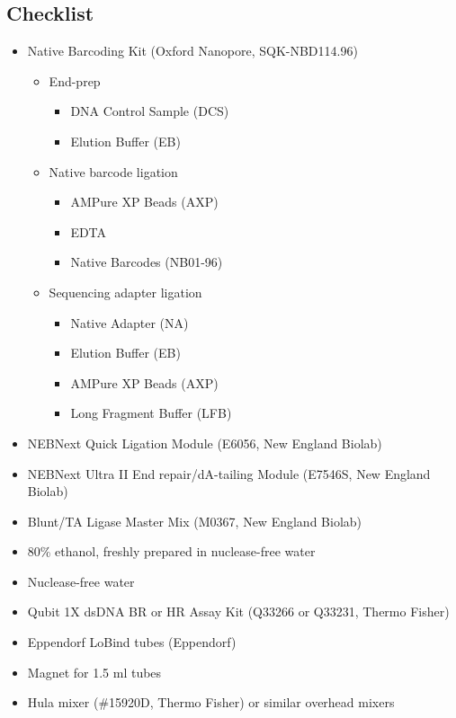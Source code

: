 \documentclass[
]{book}
\providecommand{\tightlist}{%
  \setlength{\itemsep}{0pt}\setlength{\parskip}{0pt}}
\begin{document}
\subsection{Checklist}\label{checklist-3}

\begin{itemize}
\tightlist
\item
  Native Barcoding Kit (Oxford Nanopore, SQK-NBD114.96)

  \begin{itemize}
  \tightlist
  \item
    End-prep

    \begin{itemize}
    \tightlist
    \item
      DNA Control Sample (DCS)
    \item
      Elution Buffer (EB)
    \end{itemize}
  \item
    Native barcode ligation

    \begin{itemize}
    \tightlist
    \item
      AMPure XP Beads (AXP)
    \item
      EDTA
    \item
      Native Barcodes (NB01-96)
    \end{itemize}
  \item
    Sequencing adapter ligation

    \begin{itemize}
    \tightlist
    \item
      Native Adapter (NA)
    \item
      Elution Buffer (EB)
    \item
      AMPure XP Beads (AXP)
    \item
      Long Fragment Buffer (LFB)
    \end{itemize}
  \end{itemize}
\item
  NEBNext Quick Ligation Module (E6056, New England Biolab)
\item
  NEBNext Ultra II End repair/dA-tailing Module (E7546S, New England Biolab)
\item
  Blunt/TA Ligase Master Mix (M0367, New England Biolab)
\item
  80\% ethanol, freshly prepared in nuclease-free water
\item
  Nuclease-free water
\item
  Qubit 1X dsDNA BR or HR Assay Kit (Q33266 or Q33231, Thermo Fisher)
\item
  Eppendorf LoBind tubes (Eppendorf)
\item
  Magnet for 1.5 ml tubes
\item
  Hula mixer (\#15920D, Thermo Fisher) or similar overhead mixers
\end{itemize}
\end{document}

